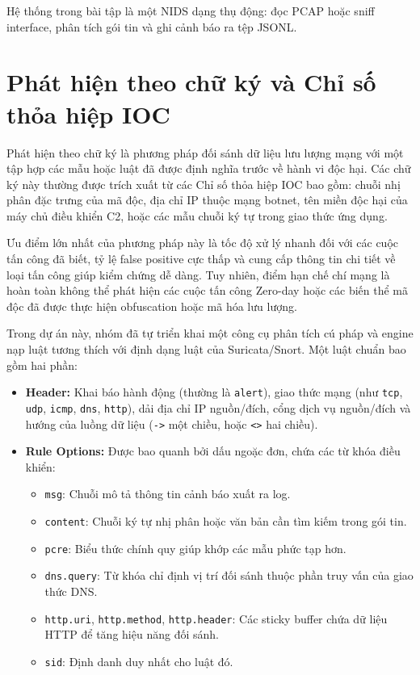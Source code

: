 Hệ thống trong bài tập là một NIDS dạng thụ động: đọc PCAP hoặc sniff interface, phân tích gói tin và ghi cảnh báo ra tệp JSONL.

\section{Phát hiện theo chữ ký và Chỉ số thỏa hiệp IOC}
Phát hiện theo chữ ký là phương pháp đối sánh dữ liệu lưu lượng mạng với một tập hợp các mẫu hoặc luật đã được định nghĩa trước về hành vi độc hại. Các chữ ký này thường được trích xuất từ các Chỉ số thỏa hiệp IOC bao gồm: chuỗi nhị phân đặc trưng của mã độc, địa chỉ IP thuộc mạng botnet, tên miền độc hại của máy chủ điều khiển C2, hoặc các mẫu chuỗi ký tự trong giao thức ứng dụng.

Ưu điểm lớn nhất của phương pháp này là tốc độ xử lý nhanh đối với các cuộc tấn công đã biết, tỷ lệ false positive cực thấp và cung cấp thông tin chi tiết về loại tấn công giúp kiểm chứng dễ dàng. Tuy nhiên, điểm hạn chế chí mạng là hoàn toàn không thể phát hiện các cuộc tấn công Zero-day hoặc các biến thể mã độc đã được thực hiện obfuscation hoặc mã hóa lưu lượng.

Trong dự án này, nhóm đã tự triển khai một công cụ phân tích cú pháp và engine nạp luật tương thích với định dạng luật của Suricata/Snort. Một luật chuẩn bao gồm hai phần:
\begin{itemize}
    \item \textbf{Header:} Khai báo hành động (thường là \texttt{alert}), giao thức mạng (như \texttt{tcp}, \texttt{udp}, \texttt{icmp}, \texttt{dns}, \texttt{http}), dải địa chỉ IP nguồn/đích, cổng dịch vụ nguồn/đích và hướng của luồng dữ liệu (\texttt{->} một chiều, hoặc \texttt{<>} hai chiều).
    \item \textbf{Rule Options:} Được bao quanh bởi dấu ngoặc đơn, chứa các từ khóa điều khiển:
    \begin{itemize}
        \item \texttt{msg}: Chuỗi mô tả thông tin cảnh báo xuất ra log.
        \item \texttt{content}: Chuỗi ký tự nhị phân hoặc văn bản cần tìm kiếm trong gói tin.
        \item \texttt{pcre}: Biểu thức chính quy giúp khớp các mẫu phức tạp hơn.
        \item \texttt{dns.query}: Từ khóa chỉ định vị trí đối sánh thuộc phần truy vấn của giao thức DNS.
        \item \texttt{http.uri}, \texttt{http.method}, \texttt{http.header}: Các sticky buffer chứa dữ liệu HTTP để tăng hiệu năng đối sánh.
        \item \texttt{sid}: Định danh duy nhất cho luật đó.
    \end{itemize}
\end{itemize}

